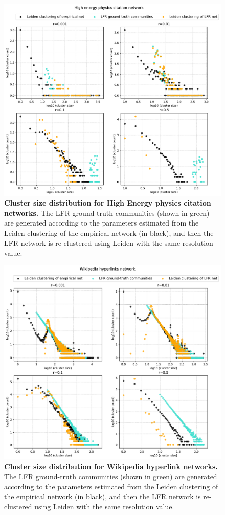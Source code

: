 \documentclass[a4paper]{article}   	%
\begin{document}
\begin{figure}[H]
\centering
\includegraphics[width=0.85\linewidth]{figs/cit_hepph_cm_size.pdf}
\caption[Cluster size distribution for High Energy physics citation networks.]{\textbf{Cluster size distribution for High Energy physics citation networks.} The LFR ground-truth communities (shown in green) are generated according to the parameters estimated from the Leiden clustering of the empirical network (in black), and then the LFR network is re-clustered using Leiden with the same resolution value. }
\end{figure}


\begin{figure}[H]
\centering
\includegraphics[width=0.85\linewidth]{figs/wiki_topcats_cm_size.pdf}
\caption[Cluster size distribution for Wikipedia hyperlink networks.]{\textbf{Cluster size distribution for Wikipedia hyperlink networks.} The LFR ground-truth communities (shown in green) are generated according to the parameters estimated from the Leiden clustering of the empirical network (in black), and then the LFR network is re-clustered using Leiden with the same resolution value. }
\end{figure}



\end{document}

